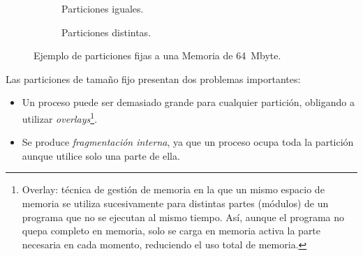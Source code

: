 \begin{figure}[!ht]
  \centering  
  \begin{subfigure}[c]{\linewidth}
    \centering
    \caption{Particiones iguales.}
  \end{subfigure}

  \vspace{5mm}

  \begin{subfigure}[c]{\linewidth}
    \centering
    \caption{Particiones distintas.}
  \end{subfigure}
  \caption{Ejemplo de particiones fijas a una Memoria de 64~Mbyte.}
  \label{fig:particionado_fijo}
\end{figure}

Las particiones de tamaño fijo presentan dos problemas importantes:
\begin{itemize}
  \item Un proceso puede ser demasiado grande para cualquier partición, obligando a utilizar \textit{overlays}\footnote{Overlay: técnica de gestión de memoria en la que un mismo espacio de memoria se utiliza sucesivamente para distintas partes (módulos) de un programa que no se ejecutan al mismo tiempo. Así, aunque el programa no quepa completo en memoria, solo se carga en memoria activa la parte necesaria en cada momento, reduciendo el uso total de memoria.}.
  \item Se produce \textit{fragmentación interna}, ya que un proceso ocupa toda la partición aunque utilice solo una parte de ella.
\end{itemize}

